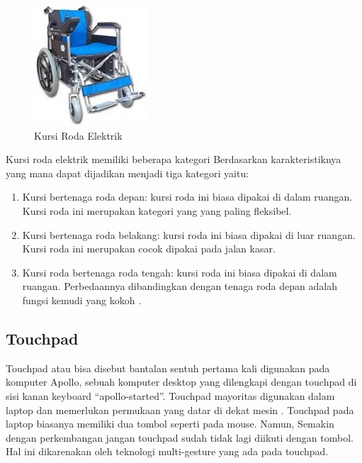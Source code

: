 \begin{figure} [H] \centering
  \includegraphics[scale=1]{gambar/kursirodaelektrik.jpg}
  \caption{Kursi Roda Elektrik \parencite{alatkesehatanonline2023}}
  \label{fig:metodelogi}
\end{figure}

Kursi roda elektrik memiliki beberapa kategori Berdasarkan karakteristiknya yang mana dapat dijadikan menjadi tiga kategori yaitu:
\begin{enumerate}
    \item Kursi bertenaga roda depan: kursi roda ini biasa dipakai di dalam ruangan. Kursi roda ini merupakan kategori yang yang paling fleksibel.
    \item Kursi bertenaga roda belakang: kursi roda ini biasa dipakai di luar ruangan. Kursi roda ini merupakan cocok dipakai pada jalan kasar.
    \item Kursi roda bertenaga roda tengah: kursi roda ini biasa dipakai di dalam ruangan. Perbedaannya dibandingkan dengan tenaga roda depan adalah fungsi kemudi yang kokoh \parencite{Asnan2019SNI}. 
\end{enumerate}

\subsection{Touchpad}
Touchpad atau bisa disebut bantalan sentuh pertama kali digunakan pada komputer Apollo, sebuah komputer desktop yang dilengkapi dengan touchpad di sisi kanan keyboard “apollo-started”. Touchpad mayoritas digunakan dalam laptop dan memerlukan permukaan yang datar di dekat mesin \parencite{sains_2023}. Touchpad pada laptop biasanya memiliki dua tombol seperti pada mouse. Namun, Semakin dengan perkembangan jangan touchpad sudah tidak lagi diikuti dengan tombol. Hal ini dikarenakan oleh teknologi multi-gesture yang ada pada touchpad.

